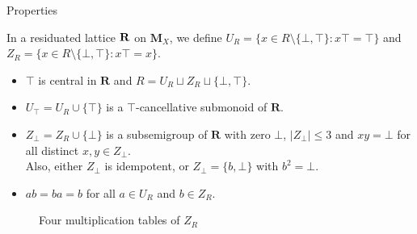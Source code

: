 \documentclass[professionalfont, 12pt]{beamer} %
\theoremstyle{plain}
\theoremstyle{definition}
\begin{document}
\begin{frame}{Properties}

In a residuated lattice $\bf{R}$ on $\mathbf{M}_X$, we define $U_R = \{x \in R \setminus \{\bot, \top\}: x \top = \top\}$ and $Z_R = \{x \in R \setminus \{\bot, \top\}: x \top = x\}$.
\pause

\begin{itemize}
    \item $\top$ is central in $\mathbf{R}$ and $R = U_R \sqcup Z_R \sqcup \{\bot, \top\}$.
    
    \item $U_{\top} = U_R \cup \{\top\}$ is a $\top$-cancellative submonoid of $\mathbf{R}$.
    
    \item $Z_{\bot} = Z_R \cup \{\bot\}$ is a subsemigroup of $\mathbf{R}$ with zero $\bot$, $|Z_{\bot}| \leq 3$ and $xy = \bot$ for all distinct $x, y \in Z_{\bot}$.\\    
    Also, either $Z_{\bot}$ is idempotent, or $Z_{\bot} = \{b, \bot\}$ with $b^2=\bot$.
    
    \item $ab = ba = b$ for all $a \in U_R$ and $b \in Z_R$.
\end{itemize}

\begin{figure}[h]
\centering
{}
\caption{Four multiplication tables of $Z_R$}
\label{f:4tables}
\end{figure}

\end{frame}
\end{document}
